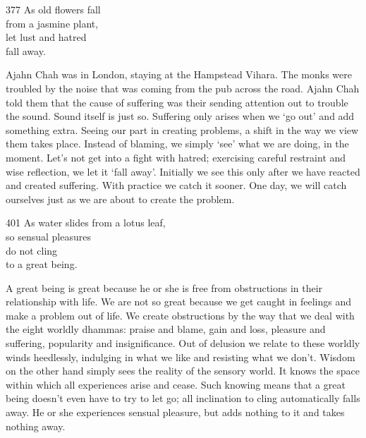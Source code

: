 
\begin{dhpVerse}{377}
\label{dhp-377}
As old flowers fall\\
from a jasmine plant,\\
let lust and hatred\\
fall away.
\end{dhpVerse}

\begin{dhpRefl}

Ajahn Chah was in London, staying at the Hampstead Vihara. The monks
were troubled by the noise that was coming from the pub across the
road. Ajahn Chah told them that the cause of suffering was their
sending attention out to trouble the sound. Sound itself is just so.
Suffering only arises when we `go out' and add something extra.
Seeing our part in creating problems, a shift in the way we view
them takes place. Instead of blaming, we simply `see' what we are
doing, in the moment. Let's not get into a fight with hatred;
exercising careful restraint and wise reflection, we let it `fall
away'. Initially we see this only after we have reacted and created
suffering. With practice we catch it sooner. One day, we will catch
ourselves just as we are about to create the problem.

\end{dhpRefl}


\begin{dhpVerse}{401}
\label{dhp-401}
As water slides from a lotus leaf,\\
so sensual pleasures\\
do not cling\\
to a great being.
\end{dhpVerse}

\begin{dhpRefl}

A great being is great because he or she is free from obstructions in
their relationship with life. We are not so great because we get
caught in feelings and make a problem out of life. We create
obstructions by the way that we deal with the eight worldly dhammas:
praise and blame, gain and loss, pleasure and suffering, popularity
and insignificance. Out of delusion we relate to these worldly winds
heedlessly, indulging in what we like and resisting what we don't.
Wisdom on the other hand simply sees the reality of the sensory
world. It knows the space within which all experiences arise and
cease. Such knowing means that a great being doesn't even have to try to
let go; all inclination to cling automatically falls away. He or she
experiences sensual pleasure, but adds nothing to it and takes nothing
away.

\end{dhpRefl}

